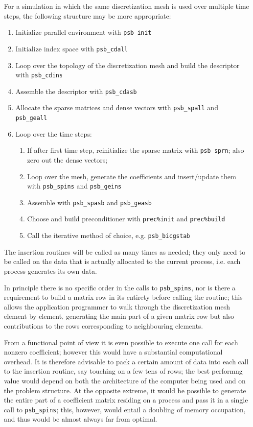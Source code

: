 For a simulation in which the same discretization mesh is used over
multiple time steps, the following structure may be more appropriate:
\begin{enumerate}
\item Initialize parallel environment with \verb|psb_init|
\item Initialize index space with \verb|psb_cdall|
\item Loop over the topology of the discretization mesh and build the
  descriptor with \verb|psb_cdins|
\item Assemble the descriptor with \verb|psb_cdasb|
\item Allocate the sparse matrices and dense vectors with
  \verb|psb_spall| and \verb|psb_geall|
\item Loop over the time steps: 
\begin{enumerate}
\item If after first time step, 
  reinitialize the sparse matrix with \verb|psb_sprn|; also zero out
  the dense vectors;
\item Loop over the mesh, generate the coefficients and insert/update
  them with \verb|psb_spins| and \verb|psb_geins|
\item Assemble with \verb|psb_spasb| and \verb|psb_geasb|
\item Choose and build preconditioner with \verb|prec%init| and
  \verb|prec%build|
\item Call the iterative method of choice, e.g. \verb|psb_bicgstab|
 \end{enumerate}
\end{enumerate}
The insertion routines will be called as many times as needed; 
they only need to  be called on the data that is actually
allocated to the current process, i.e. each process generates its own
data. 

In principle there is no specific order in the calls to
\verb|psb_spins|, nor is there a requirement to build a matrix row in
its entirety before calling the routine; this allows the application
programmer to walk through the discretization mesh element by element,
generating the main part of a given matrix row but also contributions
to the rows corresponding to neighbouring elements. 

From a functional point of view it is even possible to execute one
call for each nonzero coefficient; however this would have a
substantial computational overhead. It is therefore advisable to pack
a certain amount of data into each call to the insertion routine, say
touching on a few tens of rows; the best performng value would depend
on both the architecture of the computer being used and on the problem
structure. 
At the opposite extreme, it would be possible to generate the entire
part of a coefficient matrix residing on a process and pass it in a
single call to \verb|psb_spins|; this, however, would entail a
doubling of memory occupation, and thus would be almost always far
from optimal. 

